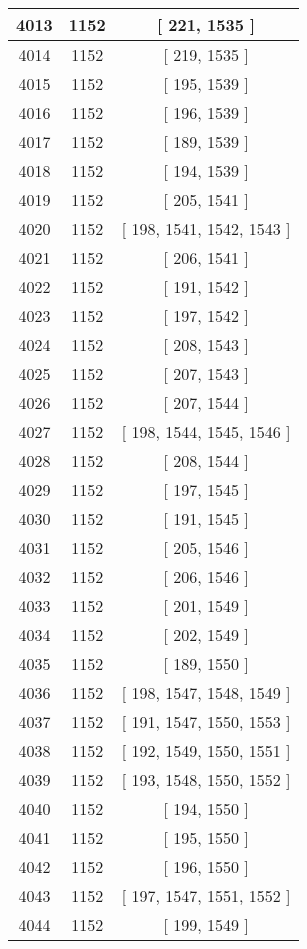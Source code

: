 \begin{center}
\begin{longtable}[H]{|| c c c ||}
\hline
4013 & 1152 & [ 221, 1535 ] \\ 
\hline
4014 & 1152 & [ 219, 1535 ] \\ 
\hline
4015 & 1152 & [ 195, 1539 ] \\ 
\hline
4016 & 1152 & [ 196, 1539 ] \\ 
\hline
4017 & 1152 & [ 189, 1539 ] \\ 
\hline
4018 & 1152 & [ 194, 1539 ] \\ 
\hline
4019 & 1152 & [ 205, 1541 ] \\ 
\hline
4020 & 1152 & [ 198, 1541, 1542, 1543 ] \\ 
\hline
4021 & 1152 & [ 206, 1541 ] \\ 
\hline
4022 & 1152 & [ 191, 1542 ] \\ 
\hline
4023 & 1152 & [ 197, 1542 ] \\ 
\hline
4024 & 1152 & [ 208, 1543 ] \\ 
\hline
4025 & 1152 & [ 207, 1543 ] \\ 
\hline
4026 & 1152 & [ 207, 1544 ] \\ 
\hline
4027 & 1152 & [ 198, 1544, 1545, 1546 ] \\ 
\hline
4028 & 1152 & [ 208, 1544 ] \\ 
\hline
4029 & 1152 & [ 197, 1545 ] \\ 
\hline
4030 & 1152 & [ 191, 1545 ] \\ 
\hline
4031 & 1152 & [ 205, 1546 ] \\ 
\hline
4032 & 1152 & [ 206, 1546 ] \\ 
\hline
4033 & 1152 & [ 201, 1549 ] \\ 
\hline
4034 & 1152 & [ 202, 1549 ] \\ 
\hline
4035 & 1152 & [ 189, 1550 ] \\ 
\hline
4036 & 1152 & [ 198, 1547, 1548, 1549 ] \\ 
\hline
4037 & 1152 & [ 191, 1547, 1550, 1553 ] \\ 
\hline
4038 & 1152 & [ 192, 1549, 1550, 1551 ] \\ 
\hline
4039 & 1152 & [ 193, 1548, 1550, 1552 ] \\ 
\hline
4040 & 1152 & [ 194, 1550 ] \\ 
\hline
4041 & 1152 & [ 195, 1550 ] \\ 
\hline
4042 & 1152 & [ 196, 1550 ] \\ 
\hline
4043 & 1152 & [ 197, 1547, 1551, 1552 ] \\ 
\hline
4044 & 1152 & [ 199, 1549 ] \\ 

\end{longtable}
\end{center}
